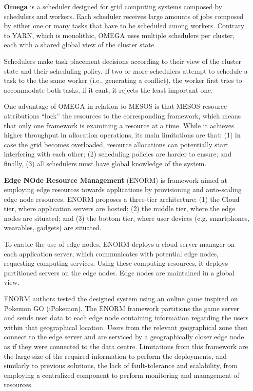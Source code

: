 \textbf{Omega} \cite{41684} is a scheduler designed for grid computing systems composed by schedulers and workers. Each scheduler receives large amounts of jobs composed by either one or many tasks that have to be scheduled among workers. Contrary to YARN, which is monolithic, OMEGA uses multiple schedulers per cluster, each with a shared global view of the cluster state.

Schedulers make task placement decisions according to their view of the cluster state and their scheduling policy. If two or more schedulers attempt to schedule a task to the the same worker (i.e., generating a conflict), the worker first tries to accommodate both tasks, if it cant, it rejects the least important one.

One advantage of OMEGA in relation to MESOS is that MESOS resource attributions ``lock'' the resources to the corresponding framework,  which means that only one framework is examining a resource at a time. While it achieves higher throughput in allocation operations, its main limitations are that: (1) in case the grid becomes overloaded, resource allocations can potentially start interfering with each other; (2) scheduling policies are harder to ensure; and finally, (3) all schedulers must have global knowledge of the system.

\textbf{Edge NOde Resource Management} \cite{wang2017enorm} (ENORM) is framework aimed at employing edge resources towards applications by provisioning and auto-scaling edge node resources. ENORM proposes a three-tier architecture: (1) the Cloud tier, where application servers are hosted; (2) the middle tier, where the edge nodes are situated; and (3) the bottom tier, where user devices (e.g. smartphones, wearables, gadgets) are situated.

To enable the use of edge nodes, ENORM deploys a cloud server manager on each application server, which communicates with potential edge nodes, requesting computing services. Using these computing resources, it deploys partitioned servers on the edge nodes. Edge nodes are maintained in a global view.

ENORM authors tested the designed system using an online game inspired on Pokemon GO (iPokemon)\cite{pokemonGo}. The ENORM framework partitions the game server and sends user data to each edge node containing information regarding the users within that geographical location. Users from the relevant geographical zone then connect to the edge server and are serviced by a geographically closer edge node as if they were connected to the data centre. Limitations from this framework are the large size of the required information to perform the deployments, and similarly to previous solutions, the lack of fault-tolerance and scalability, from employing a centralized component to perform monitoring and management of resources.

